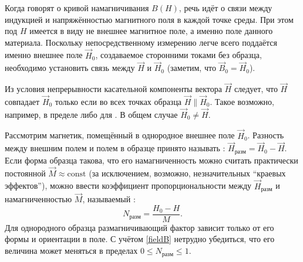 %


\label{sec:measure-HB}


Когда говорят о кривой намагничивания $B(H)$,
речь идёт о  связи между
индукцией и напряжённостью магнитного поля в каждой точке среды.
При этом под $H$ имеется в виду не внешнее магнитное поле,
а именно поле  данного материала. Поскольку непосредственному
измерению легче всего поддаётся именно внешнее поле $\vec{H}_{0}$,
создаваемое сторонними токами без образца, необходимо установить связь
между $\vec{H}$ и $\vec{H}_0$ (заметим, что $\vec{B}_0=\vec{H}_0$).

Из условия непрерывности касательной компоненты вектора $\vec{H}$ следует,
что $\vec{H}$ совпадает $\vec{H}_{0}$ только если во всех точках образца
$\vec{H} \parallel \vec{H}_{0}$.
Такое возможно, например, в пределе  либо
для .
В общем случае $\vec{H}_0 \ne \vec{H}$.

Рассмотрим магнетик, помещённый в однородное внешнее поле $\vec{H}_0$.
Разность между внешним полем и полем в образце принято называть
:
$\vec{H}_{разм} = \vec{H}_0 - \vec{H}$.
Если форма образца такова, что его намагниченность можно считать
практически постоянной $\vec{M}\approx\mathrm{const}$ (за исключением,
возможно, незначительных ``краевых эффектов''), можно ввести
коэффициент пропорциональности между $\vec{H}_{разм}$ и намагниченностью $\vec{M}$,
называемый :
\begin{equation*}
N_{разм} = \frac{H_0-H}{M}.
\end{equation*}
Для однородного образца размагничивающий фактор зависит
только от его формы и ориентации в поле.
С учётом \eqref{fieldB} нетрудно убедиться, что его величина может меняться в пределах $0\le N_{разм} \le 1$.

